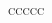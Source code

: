 \documentclass{article}
\begin{document}
\begin{table}
\begin{adjustbox}{width=1.1\textwidth}
\begin{tabulary}{\linewidth}{\textsc{ccccc}}












\end{tabulary}
\end{adjustbox}
\caption{}
\end{table}
\end{document}
